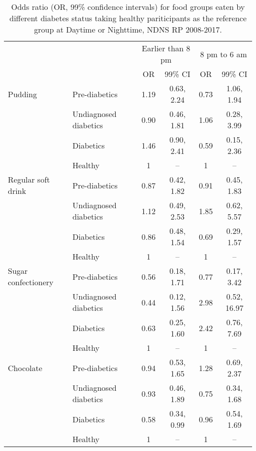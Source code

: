 \documentclass[utf8]{frontiers_suppmat} %
\begin{document}
\begin{table}[]
\caption{Odds ratio (OR, 99\% confidence intervals) for food groups eaten by different diabetes status taking healthy pariticipants as the reference group at Daytime or Nighttime, NDNS RP 2008-2017.}
\tiny
\begin{tabular}{llcccc}
\toprule
                    &                       &  \multicolumn{2}{c}{Earlier than 8 pm} & \multicolumn{2}{c}{8 pm to 6 am} \\ \cline{3-6} 
                    &                       & OR   & 99\% CI    & OR   & 99\% CI     \\ \midrule
Pudding             & Pre-diabetics         & 1.19 & 0.63, 2.24 & 0.73 & 1.06, 1.94  \\
                    & Undiagnosed diabetics & 0.90 & 0.46, 1.81 & 1.06 & 0.28, 3.99  \\
                    & Diabetics             & 1.46 & 0.90, 2.41 & 0.59 & 0.15, 2.36  \\
                    & Healthy               & 1    & --         & 1    & --          \\
Regular soft drink  & Pre-diabetics         & 0.87 & 0.42, 1.82 & 0.91 & 0.45, 1.83  \\
                    & Undiagnosed diabetics & 1.12 & 0.49, 2.53 & 1.85 & 0.62, 5.57  \\
                    & Diabetics             & 0.86 & 0.48, 1.54 & 0.69 & 0.29, 1.57  \\
                    & Healthy               & 1    & --         & 1    & --          \\
Sugar confectionery & Pre-diabetics         & 0.56 & 0.18, 1.71 & 0.77 & 0.17, 3.42  \\
                    & Undiagnosed diabetics & 0.44 & 0.12, 1.56 & 2.98 & 0.52, 16.97 \\
                    & Diabetics             & 0.63 & 0.25, 1.60 & 2.42 & 0.76, 7.69  \\
                    & Healthy               & 1    & --         & 1    & --          \\
Chocolate           & Pre-diabetics         & 0.94 & 0.53, 1.65 & 1.28 & 0.69, 2.37  \\
                    & Undiagnosed diabetics & 0.93 & 0.46, 1.89 & 0.75 & 0.34, 1.68  \\
                    & Diabetics             & 0.58 & 0.34, 0.99 & 0.96 & 0.54, 1.69  \\
                    & Healthy               & 1    & --         & 1    & --          \\

\end{tabular}
\end{table}
\end{document}
